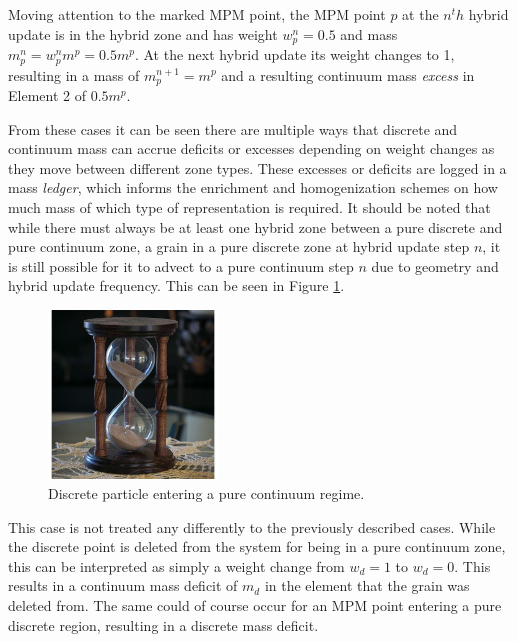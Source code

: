Moving attention to the marked MPM point, the MPM point $p$ at the $n^th$ hybrid update is in the hybrid zone and has weight $w^n_p=0.5$ and mass $m^n_p=w^n_p m^p=0.5m^p$. At the next hybrid update its weight changes to 1, resulting in a mass of $m^{n+1}_p=m^p$ and a resulting continuum mass \textit{excess} in Element 2 of $0.5m^p$. 

From these cases it can be seen there are multiple ways that discrete and continuum mass can accrue deficits or excesses depending on weight changes as they move between different zone types. These excesses or deficits are logged in a mass \textit{ledger}, which informs the enrichment and homogenization schemes on how much mass of which type of representation is required. It should be noted that while there must always be at least one hybrid zone between a pure discrete and pure continuum zone, a grain in a pure discrete zone at hybrid update step $n$, it is still possible for it to advect to a pure continuum step $n$ due to geometry and hybrid update frequency. This can be seen in Figure \ref{pure_dem_to_continuum}.

\begin{figure}[htp] 
    \centering
    \includegraphics[width=0.4\textwidth]{figs/hourglass_whole.jpg}
    \caption{Discrete particle entering a pure continuum regime.}
    \label{pure_dem_to_continuum}
\end{figure}

This case is not treated any differently to the previously described cases. While the discrete point is deleted from the system for being in a pure continuum zone, this can be interpreted as simply a weight change from $w_d=1$ to $w_d=0$. This results in a continuum mass deficit of $m_d$ in the element that the grain was deleted from. The same could of course occur for an MPM point entering a pure discrete region, resulting in a discrete mass deficit.

